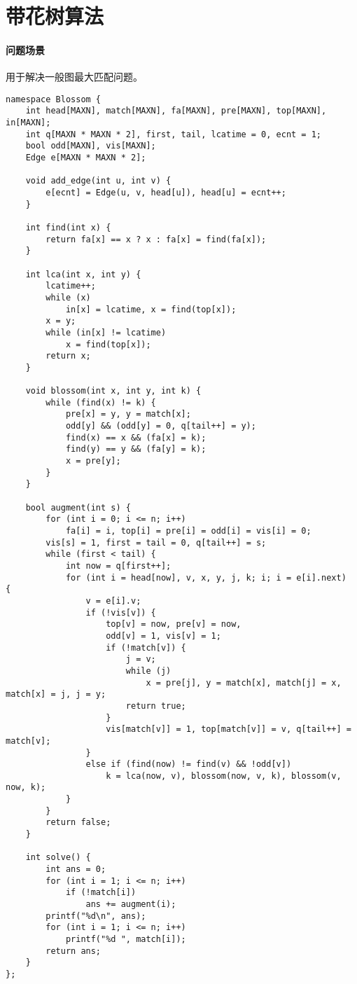 \section{带花树算法}

\paragraph{问题场景} 用于解决一般图最大匹配问题。

\begin{verbatim}
namespace Blossom {
    int head[MAXN], match[MAXN], fa[MAXN], pre[MAXN], top[MAXN], in[MAXN];
    int q[MAXN * MAXN * 2], first, tail, lcatime = 0, ecnt = 1;
    bool odd[MAXN], vis[MAXN];
    Edge e[MAXN * MAXN * 2];
    
    void add_edge(int u, int v) {
        e[ecnt] = Edge(u, v, head[u]), head[u] = ecnt++;
    }
    
    int find(int x) {
        return fa[x] == x ? x : fa[x] = find(fa[x]);
    }
    
    int lca(int x, int y) {
        lcatime++;
        while (x)
            in[x] = lcatime, x = find(top[x]);
        x = y;
        while (in[x] != lcatime)
            x = find(top[x]);
        return x;
    }
    
    void blossom(int x, int y, int k) {
        while (find(x) != k) {
            pre[x] = y, y = match[x];
            odd[y] && (odd[y] = 0, q[tail++] = y);
            find(x) == x && (fa[x] = k);
            find(y) == y && (fa[y] = k);
            x = pre[y];
        }
    }
    
    bool augment(int s) {
        for (int i = 0; i <= n; i++)
            fa[i] = i, top[i] = pre[i] = odd[i] = vis[i] = 0;
        vis[s] = 1, first = tail = 0, q[tail++] = s;
        while (first < tail) {
            int now = q[first++];
            for (int i = head[now], v, x, y, j, k; i; i = e[i].next)  {
                v = e[i].v;
                if (!vis[v]) {
                    top[v] = now, pre[v] = now,
                    odd[v] = 1, vis[v] = 1;
                    if (!match[v]) {
                        j = v;
                        while (j)
                            x = pre[j], y = match[x], match[j] = x, match[x] = j, j = y;
                        return true;
                    }
                    vis[match[v]] = 1, top[match[v]] = v, q[tail++] = match[v];
                }
                else if (find(now) != find(v) && !odd[v])
                    k = lca(now, v), blossom(now, v, k), blossom(v, now, k);
            }
        }
        return false;
    }
    
    int solve() {
        int ans = 0;
        for (int i = 1; i <= n; i++)
            if (!match[i])
                ans += augment(i);
        printf("%d\n", ans);
        for (int i = 1; i <= n; i++)
            printf("%d ", match[i]);
        return ans;
    }
};
\end{verbatim}